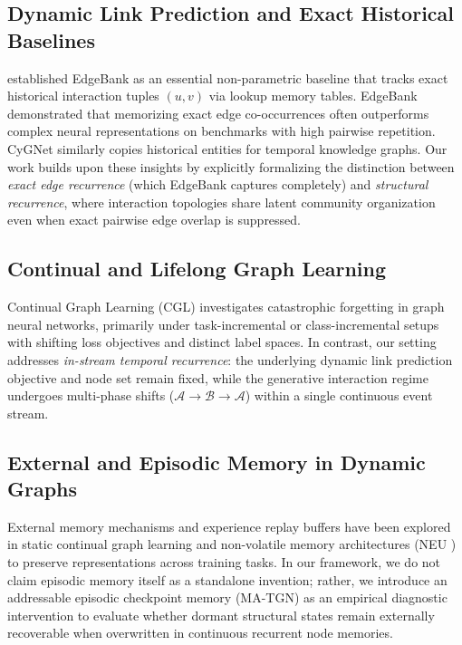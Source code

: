 \documentclass[10pt,twocolumn,letterpaper]{article}
\begin{document}
\subsection{Dynamic Link Prediction and Exact Historical Baselines}
\citet{poursafaei2022towards} established EdgeBank as an essential non-parametric baseline that tracks exact historical interaction tuples $(u, v)$ via lookup memory tables. EdgeBank demonstrated that memorizing exact edge co-occurrences often outperforms complex neural representations on benchmarks with high pairwise repetition. CyGNet \citep{zhu2021learning} similarly copies historical entities for temporal knowledge graphs. Our work builds upon these insights by explicitly formalizing the distinction between \textit{exact edge recurrence} (which EdgeBank captures completely) and \textit{structural recurrence}, where interaction topologies share latent community organization even when exact pairwise edge overlap is suppressed.

\subsection{Continual and Lifelong Graph Learning}
Continual Graph Learning (CGL) \citep{kou2020continual, zhou2021overcoming, xu2020graphsail, liu2021lifelong, zhang2024continual, kirkpatrick2017overcoming} investigates catastrophic forgetting in graph neural networks, primarily under task-incremental or class-incremental setups with shifting loss objectives and distinct label spaces. In contrast, our setting addresses \textit{in-stream temporal recurrence}: the underlying dynamic link prediction objective and node set remain fixed, while the generative interaction regime undergoes multi-phase shifts ($\mathcal{A} \to \mathcal{B} \to \mathcal{A}$) within a single continuous event stream.

\subsection{External and Episodic Memory in Dynamic Graphs}
External memory mechanisms and experience replay buffers have been explored in static continual graph learning \citep{kou2020continual, zhou2021overcoming} and non-volatile memory architectures (NEU \citep{zhang2022neu}) to preserve representations across training tasks. In our framework, we do not claim episodic memory itself as a standalone invention; rather, we introduce an addressable episodic checkpoint memory (MA-TGN) as an empirical diagnostic intervention to evaluate whether dormant structural states remain externally recoverable when overwritten in continuous recurrent node memories.
\end{document}
